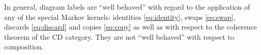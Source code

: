 






In general, diagram labels are ``well behaved'' with regard to the application of any of the special Markov kernels: identities \ref{eq:identity}, swaps \ref{eq:swap}, discards \ref{eq:discard} and copies \ref{eq:copy} as well as with respect to the coherence theorem of the CD category. They are not ``well behaved'' with respect to composition.


